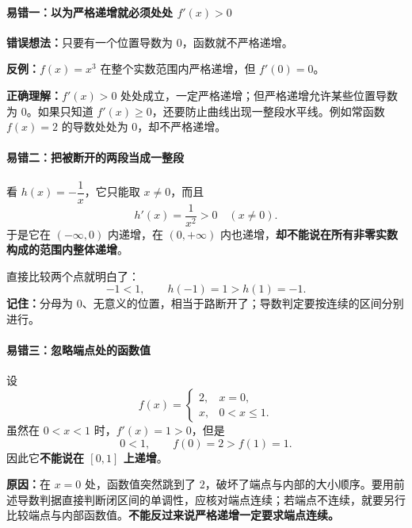 \clearpage
\begin{trapbox}
\begin{minipage}{\linewidth}
\paragraph{易错一：以为严格递增就必须处处 $f'(x)>0$}

\end{minipage}

\textbf{错误想法：}只要有一个位置导数为 $0$，函数就不严格递增。

\textbf{反例：}$f(x)=x^3$ 在整个实数范围内严格递增，但 $f'(0)=0$。

\textbf{正确理解：}$f'(x)>0$ 处处成立，一定严格递增；但严格递增允许某些位置导数为 $0$。如果只知道 $f'(x)\ge0$，还要防止曲线出现一整段水平线。例如常函数 $f(x)=2$ 的导数处处为 $0$，却不严格递增。

\begin{minipage}{\linewidth}
\paragraph{易错二：把被断开的两段当成一整段}

\end{minipage}

看 $h(x)=-\dfrac{1}{x}$，它只能取 $x\ne0$，而且
\[
h'(x)=\frac1{x^2}>0\quad(x\ne0).
\]
于是它在 $(-\infty,0)$ 内递增，在 $(0,+\infty)$ 内也递增，\textbf{却不能说在所有非零实数构成的范围内整体递增}。

直接比较两个点就明白了：
\[
-1<1,\qquad h(-1)=1>h(1)=-1.
\]
\textbf{记住：}分母为 $0$、无意义的位置，相当于路断开了；导数判定要按连续的区间分别进行。

\newpage
\begin{minipage}{\linewidth}
\paragraph{易错三：忽略端点处的函数值}

\end{minipage}

设
\[
f(x)=\begin{cases}
2,&x=0,\\
x,&0<x\le1.
\end{cases}
\]
虽然在 $0<x<1$ 时，$f'(x)=1>0$，但是
\[
0<1,\qquad f(0)=2>f(1)=1.
\]
因此它\textbf{不能说在 $[0,1]$ 上递增}。

\textbf{原因：}在 $x=0$ 处，函数值突然跳到了 $2$，破坏了端点与内部的大小顺序。要用前述导数判据直接判断闭区间的单调性，应核对端点连续；若端点不连续，就要另行比较端点与内部函数值。\textbf{不能反过来说严格递增一定要求端点连续。}


\end{trapbox}

